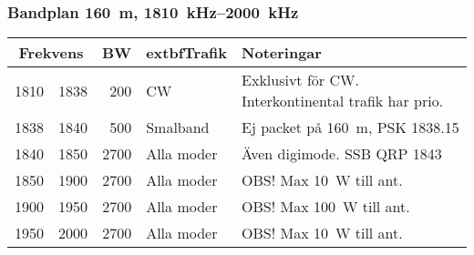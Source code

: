 \subsubsection{Bandplan \SI{160}{\metre}, \SIrange{1810}{2000}{\kilo\hertz}}
\begin{tabular}{rrrll}
\multicolumn{2}{c}{\textbf{Frekvens}} & \textbf{BW} & extbf{Trafik} & \textbf{Noteringar} \\ \hline

1810 & 1838 & 200  & CW         & Exklusivt för CW. Interkontinental trafik har prio. \\ \hline
1838 & 1840 & 500  & Smalband   & Ej packet på \SI{160}{\meter}, PSK \num{1838,15}         \\ \hline
1840 & 1850 & 2700 & Alla moder & Även digimode. SSB QRP \num{1843}                  \\ \hline
1850 & 1900 & 2700 & Alla moder & OBS! Max \SI{10}{\watt} till ant.                       \\ \hline
1900 & 1950 & 2700 & Alla moder & OBS! Max \SI{100}{\watt} till ant.                      \\ \hline
1950 & 2000 & 2700 & Alla moder & OBS! Max \SI{10}{\watt} till ant.                       \\ \hline
\end{tabular}

